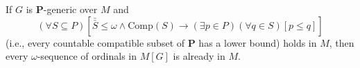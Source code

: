 If $G$ is $\mathbf{P}$-generic over $M$ and
$$(\forall S \subseteq P)[\bar{\bar{S}} \leq \omega \land \text{Comp}(S) \rightarrow (\exists p \in P)(\forall q \in S)[p \leq q]]$$
(i.e., every countable compatible subset of $\mathbf{P}$ has a lower bound) holds in $M$, then every $\omega$-sequence of ordinals in $M[G]$ is already in $M$.
